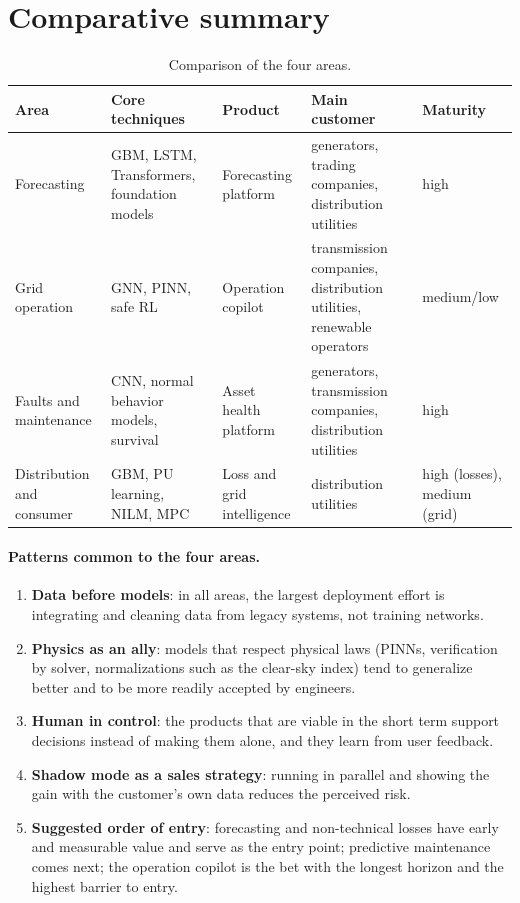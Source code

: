 \documentclass[10pt,a4paper,oneside]{article}
\begin{document}
\section{Comparative summary}

\begin{table}[h]
\small
\caption{Comparison of the four areas.}
\begin{tabelalarga}
\begin{tabularx}{\linewidth}{l L L L l}
\toprule
\textbf{Area} & \textbf{Core techniques} & \textbf{Product} &
  \textbf{Main customer} & \textbf{Maturity} \\
\midrule
Forecasting & GBM, LSTM, Transformers, foundation models &
  Forecasting platform & generators, trading companies, distribution
  utilities & high \\
Grid operation & GNN, PINN, safe RL & Operation copilot &
  transmission companies, distribution utilities, renewable operators &
  medium/low \\
Faults and maintenance & CNN, normal behavior models, survival &
  Asset health platform & generators, transmission companies, distribution
  utilities & high \\
Distribution and consumer & GBM, PU learning, NILM, MPC &
  Loss and grid intelligence & distribution utilities & high (losses),
  medium (grid) \\
\bottomrule
\end{tabularx}
\end{tabelalarga}
\end{table}

\paragraph{Patterns common to the four areas.}
\begin{enumerate}
  \item \textbf{Data before models}: in all areas, the largest deployment
    effort is integrating and cleaning data from legacy systems, not
    training networks.
  \item \textbf{Physics as an ally}: models that respect physical laws
    (PINNs, verification by solver, normalizations such as the clear-sky
    index) tend to generalize better and to be more readily accepted by
    engineers.
  \item \textbf{Human in control}: the products that are viable in the short
    term support decisions instead of making them alone, and they learn
    from user feedback.
  \item \textbf{Shadow mode as a sales strategy}: running in parallel and
    showing the gain with the customer's own data reduces the perceived
    risk.
  \item \textbf{Suggested order of entry}: forecasting and non-technical
    losses have early and measurable value and serve as the entry point;
    predictive maintenance comes next; the operation copilot is the bet
    with the longest horizon and the highest barrier to entry.
\end{enumerate}
\end{document}
